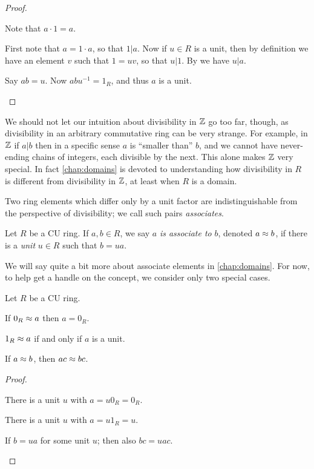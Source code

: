 \begin{proof}
\begin{inlineproplist}
\item Note that \(a \cdot 1 = a\).
\item First note that \(a = 1 \cdot a\), so that \(1|a\).
Now if \(u \in R\) is a unit, then by definition we have an element \(v\) such that \(1 = uv\), so that \(u|1\).
By  we have \(u|a\).
\item Say \(ab = u\).
Now \(abu^{-1} = 1_R\), and thus \(a\) is a unit.
\end{inlineproplist}
\end{proof}

We should not let our intuition about divisibility in \(\mathbb{Z}\) go too far, though, as divisibility in an arbitrary commutative ring can be very strange.
For example, in \(\mathbb{Z}\) if \(a|b\) then in a specific sense \(a\) is ``smaller than'' \(b\), and we cannot have never-ending chains of integers, each divisible by the next.
This alone makes \(\mathbb{Z}\) very special.
In fact \autoref{chap:domains} is devoted to understanding how divisibility in \(R\) is different from divisibility in \(\mathbb{Z}\), at least when \(R\) is a domain.

Two ring elements which differ only by a unit factor are indistinguishable from the perspective of divisibility; we call such pairs \emph{associates}.

\begin{dfn}[Associate] \label{dfn:associate}
Let \(R\) be a CU ring.
If \(a,b \in R\), we say \(a\) \emph{is associate to} \(b\), denoted \(a \approx b\), if there is a \emph{unit} \(u \in R\) such that \(b = ua\).
\end{dfn}

We will say quite a bit more about associate elements in \autoref{chap:domains}.
For now, to help get a handle on the concept, we consider only two special cases.

\begin{prop}
Let \(R\) be a CU ring.
\begin{proplist*}
\item If \(0_R \approx a\) then \(a = 0_R\).
\item \(1_R \approx a\) if and only if \(a\) is a unit.
\item If \(a \approx b\), then \(ac \approx bc\).
\end{proplist*}
\end{prop}

\begin{proof}
\begin{inlineproplist}
\item There is a unit \(u\) with \(a = u0_R = 0_R\).
\item There is a unit \(u\) with \(a = u1_R = u\).
\item If \(b = ua\) for some unit \(u\); then also \(bc = uac\).
\end{inlineproplist}
\end{proof}

